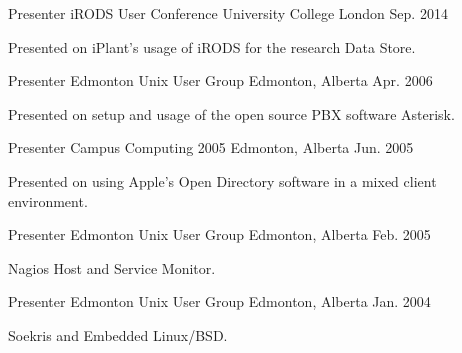 

\begin{cventries}

  \cventry
    {Presenter} %
    {iRODS User Conference} %
    {University College London} %
    {Sep. 2014} %
    {
      \begin{cvitems} %
        \item {Presented on iPlant's usage of iRODS for the research Data Store.}
      \end{cvitems}
    }

  \cventry
    {Presenter} %
    {Edmonton Unix User Group} %
    {Edmonton, Alberta} %
    {Apr. 2006} %
    {
      \begin{cvitems} %
        \item {Presented on setup and usage of the open source PBX software Asterisk.}
      \end{cvitems}
    }

  \cventry
    {Presenter} %
    {Campus Computing 2005} %
    {Edmonton, Alberta} %
    {Jun. 2005} %
    {
      \begin{cvitems} %
        \item {Presented on using Apple's Open Directory software in a mixed client environment.}
      \end{cvitems}
    }

  \cventry
    {Presenter} %
    {Edmonton Unix User Group} %
    {Edmonton, Alberta} %
    {Feb. 2005} %
    {
      \begin{cvitems} %
        \item {Nagios Host and Service Monitor.}
      \end{cvitems}
    }

  \cventry
    {Presenter} %
    {Edmonton Unix User Group} %
    {Edmonton, Alberta} %
    {Jan. 2004} %
    {
      \begin{cvitems} %
        \item {Soekris and Embedded Linux/BSD.}
      \end{cvitems}
    }


\end{cventries}
